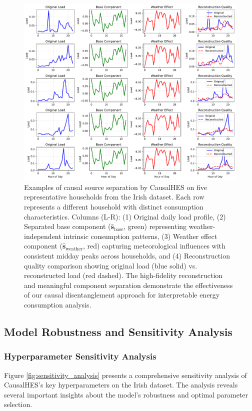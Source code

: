 \documentclass[journal]{IEEEtran}
\begin{document}
\begin{figure}[t!]
\centering
\includegraphics[width=\textwidth]{images/source_separation.pdf} 
\caption{Examples of causal source separation by CausalHES on five representative households from the Irish dataset. Each row represents a different household with distinct consumption characteristics. Columns (L-R): (1) Original daily load profile, (2) Separated base component ($\hat{\mathbf{s}}_{\text{base}}$, green) representing weather-independent intrinsic consumption patterns, (3) Weather effect component ($\hat{\mathbf{s}}_{\text{weather}}$, red) capturing meteorological influences with consistent midday peaks across households, and (4) Reconstruction quality comparison showing original load (blue solid) vs. reconstructed load (red dashed). The high-fidelity reconstruction and meaningful component separation demonstrate the effectiveness of our causal disentanglement approach for interpretable energy consumption analysis.}
\label{fig:source_separation_examples}
\end{figure}

\subsection{Model Robustness and Sensitivity Analysis}
\label{sec:hyperparameter_sensitivity}

\subsubsection{Hyperparameter Sensitivity Analysis}
Figure \ref{fig:sensitivity_analysis} presents a comprehensive sensitivity analysis of CausalHES's key hyperparameters on the Irish dataset. The analysis reveals several important insights about the model's robustness and optimal parameter selection.
\end{document}
